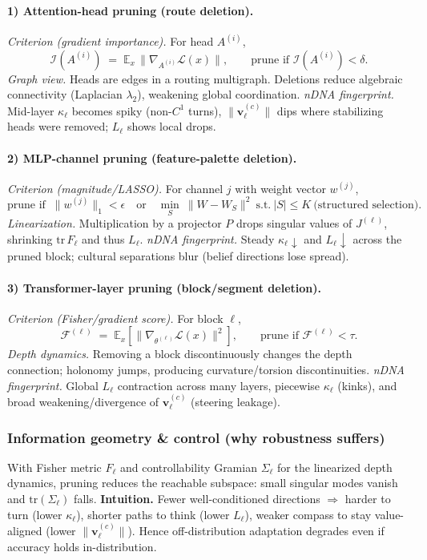 \paragraph{1) Attention-head pruning (route deletion).}
\emph{Criterion (gradient importance).} For head $A^{(i)}$,
\[
\mathcal I(A^{(i)}) \;=\; \mathbb E_{x}\,\big\|\nabla_{A^{(i)}} \mathcal L(x)\big\|, 
\qquad \text{prune if } \mathcal I(A^{(i)}) < \delta .
\]
\emph{Graph view.} Heads are edges in a routing multigraph. Deletions reduce algebraic connectivity (Laplacian $\lambda_2$), weakening global coordination.  
\emph{nDNA fingerprint.} Mid-layer $\kappa_\ell$ becomes spiky (non-$C^1$ turns), $\|\mathbf v^{(c)}_\ell\|$ dips where stabilizing heads were removed; $L_\ell$ shows local drops.

\paragraph{2) MLP-channel pruning (feature-palette deletion).}
\emph{Criterion (magnitude/LASSO).} For channel $j$ with weight vector $w^{(j)}$,
\[
\text{prune if } \ \|w^{(j)}\|_{1} < \epsilon 
\quad \text{or}\quad \min_{S}\ \|W-W_S\|^2 \ \text{s.t.}\ |S|\leq K \ \text{(structured selection)}.
\]
\emph{Linearization.} Multiplication by a projector $P$ drops singular values of $J^{(\ell)}$, shrinking $\mathrm{tr}\,F_\ell$ and thus $L_\ell$.  
\emph{nDNA fingerprint.} Steady $\kappa_\ell\!\downarrow$ and $L_\ell\!\downarrow$ across the pruned block; cultural separations blur (belief directions lose spread).

\paragraph{3) Transformer-layer pruning (block/segment deletion).}
\emph{Criterion (Fisher/gradient score).} For block $\ell$,
\[
\mathcal F^{(\ell)} \;=\; \mathbb E_x\!\left[\big\|\nabla_{\theta^{(\ell)}}\mathcal L(x)\big\|^2\right], 
\qquad \text{prune if } \mathcal F^{(\ell)} < \tau .
\]
\emph{Depth dynamics.} Removing a block discontinuously changes the depth connection; holonomy jumps, producing curvature/torsion discontinuities.  
\emph{nDNA fingerprint.} Global $L_\ell$ contraction across many layers, piecewise $\kappa_\ell$ (kinks), and broad weakening/divergence of $\mathbf v^{(c)}_\ell$ (steering leakage).

\subsubsection*{Information geometry \& control (why robustness suffers)}
With Fisher metric $F_\ell$ and controllability Gramian $\Sigma_\ell$ for the linearized depth dynamics,
pruning reduces the reachable subspace: small singular modes vanish and $\mathrm{tr}(\Sigma_\ell)$ falls.  
\textbf{Intuition.} Fewer well-conditioned directions $\Rightarrow$ harder to turn (lower $\kappa_\ell$), shorter paths to think (lower $L_\ell$), weaker compass to stay value-aligned (lower $\|\mathbf v^{(c)}_\ell\|$). 
Hence off-distribution adaptation degrades even if accuracy holds in-distribution.


